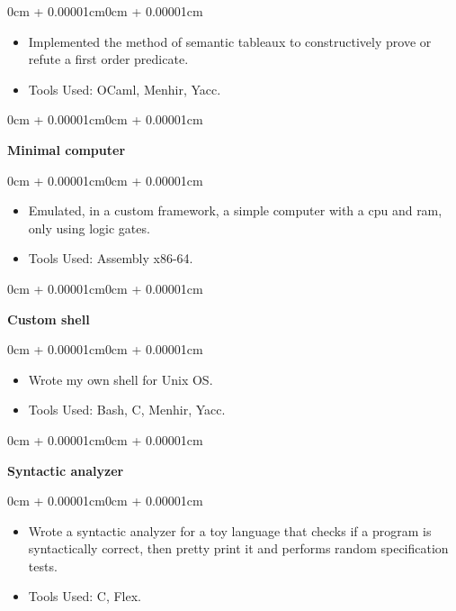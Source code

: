 \documentclass[10pt, letterpaper]{article}
\newenvironment{highlights}{
    \begin{itemize}[
        topsep=0.10cm,
        parsep=0.10cm,
        partopsep=0pt,
        itemsep=0pt,
        leftmargin=0cm + 10pt
    ]
}{
    \end{itemize}
}
\newenvironment{onecolentry}{
    \begin{adjustwidth}{0cm + 0.00001cm}{0cm + 0.00001cm}
}{
    \end{adjustwidth}
}
\begin{document}
\vspace{0.10cm}
\begin{onecolentry}
    \begin{highlights}
        \item Implemented the method of semantic tableaux to constructively prove or refute a first order predicate.
        \item Tools Used: OCaml, Menhir, Yacc.
    \end{highlights}
\end{onecolentry}

\vspace{0.2cm}

\begin{onecolentry}
    \textbf{Minimal computer}
\end{onecolentry}

\vspace{0.10cm}
\begin{onecolentry}
    \begin{highlights}
        \item Emulated, in a custom framework, a simple computer with a cpu and ram, only using logic gates.
        \item Tools Used: Assembly x86-64.
    \end{highlights}
\end{onecolentry}

\vspace{0.2cm}

\begin{onecolentry}
    \textbf{Custom shell}
\end{onecolentry}

\vspace{0.10cm}
\begin{onecolentry}
    \begin{highlights}
        \item Wrote my own shell for Unix OS.
        \item Tools Used: Bash, C, Menhir, Yacc.
    \end{highlights}
\end{onecolentry}

\vspace{0.2cm}

\begin{onecolentry}
    \textbf{Syntactic analyzer}
\end{onecolentry}

\vspace{0.10cm}
\begin{onecolentry}
    \begin{highlights}
        \item Wrote a syntactic analyzer for a toy language that checks if a program is syntactically correct, then pretty print it and performs random specification tests.
        \item Tools Used: C, Flex.
    \end{highlights}
\end{onecolentry}
\end{document}
